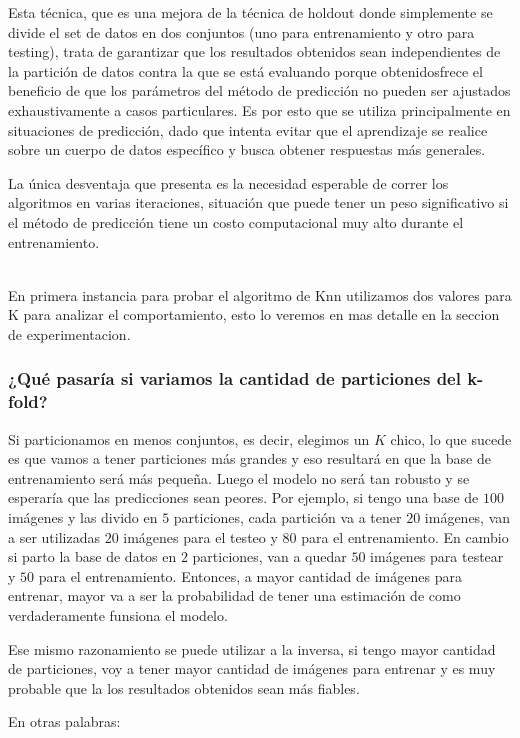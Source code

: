 Esta técnica, que es una mejora de la técnica de holdout donde simplemente se divide el set de datos en dos conjuntos (uno para entrenamiento y otro para testing), trata de garantizar que los resultados obtenidos sean independientes de la partición de datos contra la que se está evaluando porque obtenidosfrece el beneficio de que los parámetros del método de predicción no pueden ser ajustados exhaustivamente a casos particulares. Es por esto que se utiliza principalmente en situaciones de predicción, dado que intenta evitar que el aprendizaje se realice sobre un cuerpo de datos específico y busca obtener respuestas más generales.

La única desventaja que presenta es la necesidad esperable de correr los algoritmos en varias iteraciones, situación que puede tener un peso significativo si el método de predicción tiene un costo computacional muy alto durante el entrenamiento. 

\\
En primera instancia para probar el algoritmo de Knn utilizamos dos valores para K para analizar el comportamiento, esto lo veremos en mas detalle en la seccion de experimentacion.

\subsubsection{¿Qué pasaría si variamos la cantidad de particiones del k-fold?}

Si particionamos en menos conjuntos, es decir, elegimos un $K$ chico, lo que sucede es que vamos a tener particiones más grandes y eso resultará en que la base de entrenamiento será más pequeña. Luego el modelo no será tan robusto y se esperaría que las predicciones sean peores. Por ejemplo, si tengo una base de $100$ imágenes y las divido en $5$ particiones, cada partición va a tener $20$ imágenes, van a ser utilizadas $20$ imágenes para el testeo y $80$ para el entrenamiento. En cambio si parto la base de datos en $2$ particiones, van a quedar $50$ imágenes para testear y $50$ para el entrenamiento. Entonces, a mayor cantidad de imágenes para entrenar, mayor va a ser la probabilidad de tener una estimación de como verdaderamente funsiona el modelo.

Ese mismo razonamiento se puede utilizar a la inversa, si tengo mayor cantidad de particiones, voy a tener mayor cantidad de imágenes para entrenar y es muy probable que la los resultados obtenidos sean más fiables.

En otras palabras:

